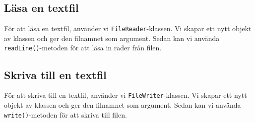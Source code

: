 \hypertarget{luxe4sa-en-textfil}{%
\subsection{Läsa en textfil}\label{luxe4sa-en-textfil}}

För att läsa en textfil, använder vi \texttt{FileReader}-klassen. Vi
skapar ett nytt objekt av klassen och ger den filnamnet som argument.
Sedan kan vi använda \texttt{readLine()}-metoden för att läsa in rader
från filen.

\hypertarget{cb2}{}
\begin{Shaded}
\begin{Highlighting}[]
\OperatorTok{=}  \OperatorTok{(}\OperatorTok{);}
\OperatorTok{=}\OperatorTok{();}
\OperatorTok{(}\OperatorTok{!=} \OperatorTok{)\{}
    \OperatorTok{(}\OperatorTok{);}
\OperatorTok{=}\OperatorTok{();}
\OperatorTok{\}}
\end{Highlighting}
\end{Shaded}

\hypertarget{skriva-till-en-textfil}{%
\subsection{Skriva till en textfil}\label{skriva-till-en-textfil}}

För att skriva till en textfil, använder vi \texttt{FileWriter}-klassen.
Vi skapar ett nytt objekt av klassen och ger den filnamnet som argument.
Sedan kan vi använda \texttt{write()}-metoden för att skriva till filen.

